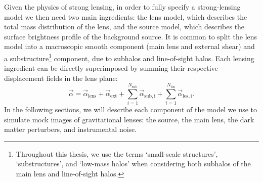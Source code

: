 %


\bigskip

Given the physics of strong lensing, in order to fully specify a strong-lensing model we then need two main ingredients: the lens model, which describes the total mass distribution of the lens, and the source model, which describes the surface brightness profile of the background source. It is common to split the lens model into a macroscopic smooth component (main lens and external shear) and a substructure\footnote{Throughout this thesis, we use the terms `small-scale structures', `substructures', and `low-mass halos' when considering both subhalos of the main lens and line-of-sight halos.} component, due to subhalos and line-of-sight halos. Each lensing ingredient can be directly superimposed by summing their respective displacement fields in the lens plane:
\begin{equation}
    \vec{\alpha} = \vec{\alpha}_\mathrm{lens} + \vec{\alpha}_\mathrm{ext} + \sum_{i=1}^{N_{\mathrm{sub}}} \vec{\alpha}_\mathrm{sub,i} + \sum_{i=1}^{N_{\mathrm{los}}} \vec{\alpha}_\mathrm{los,i}.
\end{equation}
In the following sections, we will describe each component of the model we use to simulate mock images of gravitational lenses: the source, the main lens, the dark matter perturbers, and instrumental noise. 


